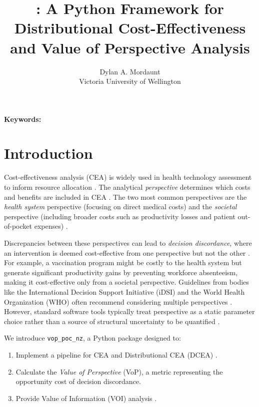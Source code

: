 \documentclass[article]{jss}
\author{Dylan A. Mordaunt\\Victoria University of Wellington}
\title{\pkg{vop\_poc\_nz}: A Python Framework for Distributional Cost-Effectiveness and Value of Perspective Analysis}
\newcommand{\pkg}[1]{\texttt{#1}}
\newcommand{\myabstract}{}
\newcommand{\mykeywords}{}
\begin{document}
\ifdefined\JSSMODE
\else
  \maketitle
  \begin{abstract}
  \myabstract
  \end{abstract}
  \noindent\textbf{Keywords:} \mykeywords
\fi

\section{Introduction} \label{sec:intro}

Cost-effectiveness analysis (CEA) is widely used in health technology assessment to inform resource allocation \citep{drummond2015}.
The analytical \emph{perspective} determines which costs and benefits are included in CEA \citep{sanders2016}.
The two most common perspectives are the \emph{health system} perspective (focusing on direct medical costs) and the \emph{societal} perspective (including broader costs such as productivity losses and patient out-of-pocket expenses) \citep{drummond2015}.

Discrepancies between these perspectives can lead to \emph{decision discordance}, where an intervention is deemed cost-effective from one perspective but not the other \citep{claxton2010}.
For example, a vaccination program might be costly to the health system but generate significant productivity gains by preventing workforce absenteeism, making it cost-effective only from a societal perspective.
Guidelines from bodies like the International Decision Support Initiative (iDSI) and the World Health Organization (WHO) often recommend considering multiple perspectives \citep{wilkinson2016, tan-torres2003}. However, standard software tools typically treat perspective as a static parameter choice rather than a source of structural uncertainty to be quantified \citep{alarid2024, filipovic2017}.

We introduce \pkg{vop\_poc\_nz}, a Python package designed to:
\begin{enumerate}
  \item Implement a pipeline for CEA and Distributional CEA (DCEA) \citep{cookson2017}.
  \item Calculate the \emph{Value of Perspective} (VoP), a metric representing the opportunity cost of decision discordance.
  \item Provide Value of Information (VOI) analysis \citep{claxton2001}.
\end{enumerate}
\end{document}
